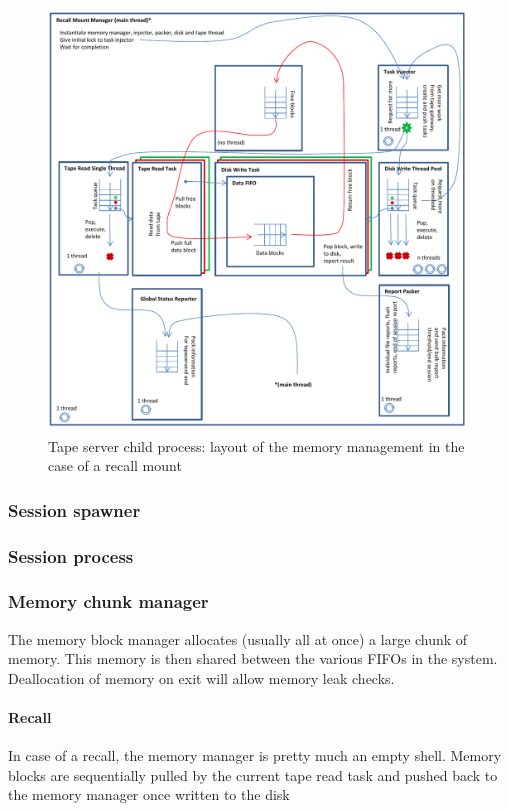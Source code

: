 \begin{figure}[h]
\begin{center}
\includegraphics[scale=0.75]{images/RecallMountMM}
\end{center}
\caption{\label{tsRecallMM}Tape server child process: layout of the memory management in the case
of a recall mount}
\end{figure}


\subsubsection{Session spawner}
\subsubsection{Session process}

\subsubsection{Memory chunk manager}

The memory block manager allocates (usually all at once) a large chunk of memory.
This memory is then shared between the various FIFOs in the system. Deallocation
of memory on exit will allow memory leak checks. 

\paragraph{Recall}
In case of a recall, the memory manager is pretty much an empty shell.
Memory blocks are sequentially pulled by the current tape read task and pushed back to the memory manager once written to the disk

